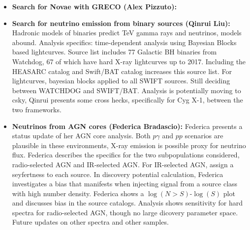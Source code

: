 \begin{itemize}
    \item \textbf{Search for Novae with GRECO (Alex Pizzuto):}
    \item \textbf{Search for neutrino emission from binary sources (Qinrui Liu):} Hadronic models of binaries predict TeV gamma rays and neutrinos, models abound. Analysis specifics: time-dependent analysis using Bayesian Blocks based lightcurves. Source list includes 77 Galactic BH binaries from Watchdog, 67 of which have hard X-ray lightcurves up to 2017. Including the HEASARC catalog and Swift/BAT catalog increases this source list. For lightcurves, bayesian blocks applied to all SWIFT sources. Still deciding between WATCHDOG and SWIFT/BAT. Analysis is potentially moving to csky, Qinrui presents some cross hecks, specifically for Cyg X-1, between the two frameworks. 
    \item \textbf{Neutrinos from AGN cores (Federica Bradascio):} Federica presents a status update of her AGN core analysis. Both $p\gamma$ and $pp$ scenarios are plausible in these environments, X-ray emission is possible proxy for neutrino flux. Federica describes the specifics for the two subpopulations considered, radio-selected AGN and IR-selected AGN. For IR-selected AGN, assign a seyfertness to each source. In discovery potential calculation, Federica investigates a bias that manifests when injecting signal from a source class with high number density. Federica shows a $\log(N>S)$-$\log(S)$ plot and discusses bias in the source catalogs. Analysis shows sensitivity for hard spectra for radio-selected AGN, though no large dicovery parameter space. Future updates on other spectra and other samples.  
\end{itemize}

